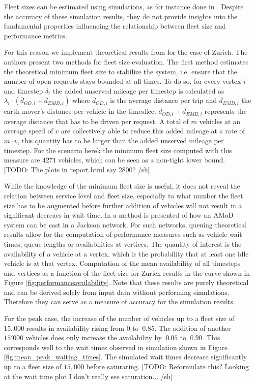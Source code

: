 Fleet sizes can be estimated using simulations, as for instance done in
\citep{bischoff2016simulation}. Despite the accuracy of these
simulation results, they do not provide insights into the fundamental
properties influencing the relationship between fleet size and performance metrics.

For this reason we implement theoretical results from \citep{spieser2014toward}
for the case of Zurich. The authors present two methods for fleet size evaluation.
The first method estimates the theoretical minimum fleet size to stabilize
the system, i.e. ensure that the number of open requests stays bounded at
all times. To do so, for every vertex $i$ and timestep $\delta_t$ the added
unserved mileage per timestep is calculated as
$\lambda_i \cdot ( \bar{d}_{OD,i}  + \bar{d}_{EMD,i})$ where $\bar{d}_{OD,i}$
is the average distance per trip and  $\bar{d}_{EMD,i}$ the earth mover's
distance per vehicle in the timeslice. $\bar{d}_{OD,i}  + \bar{d}_{EMD,i}$
represents the average distance that has to be driven per request. A total of
$m$ vehicles at an average speed of $v$ are collectively able to reduce this
 added mileage at a rate of $m \cdot v$, this quantity has to be larger than the
 added unserved mileage per timestep. For the scenario herek the
 minimum fleet size computed with this measure are $4271$ vehicles, which
 can be seen as a non-tight lower bound. [TODO: The plots in report.html say
 2800? /sh]

While the knowledge of the minimum fleet size is useful, it does not reveal
the relation between service level and fleet size, especially to what number
the fleet size has to be augmented before further addition of vehicles will
not result in a significant decreaes in wait time. In \citep{zhang2016control}
 a method is presented of how an AMoD system can be cast in a Jackson network.
 For such networks, queuing theoretical results allow for the computation of
 performance measures such as vehicle wait times, queue lengths or
 availabilities at vertices. The quantity of interest is the availability
 of a vehicle at a vertex, which is the probability that at least one idle
 vehicle is at that vertex. Computation of the mean availability of all
 timesteps and vertices as a function of the fleet size for Zurich results
 in the curve shown in Figure \ref{fig:performanceavailability}. Note that these results
 are purely theoretical and can be derived solely from input data without performing simulations.
 Therefore they can serve as a measure of accuracy for the simulation results.

For the peak case, the increase of the number of vehicles up to a fleet size of $15,000$ results
in availability rising from $0$ to $~0.85$. The addition of another $15'000$ vehicles does only
increase the availability by $~0.05$ to $~0.90$. This corresponds well to the wait times observed
 in simulation shown in Figure \ref{fig:mean_peak_waiting_times}. The simulated wait times
 decrease significantly up to a fleet size of $15,000$ before saturating.
 [TODO: Reformulate this? Looking at the wait time plot I don't really see saturation... /sh]
